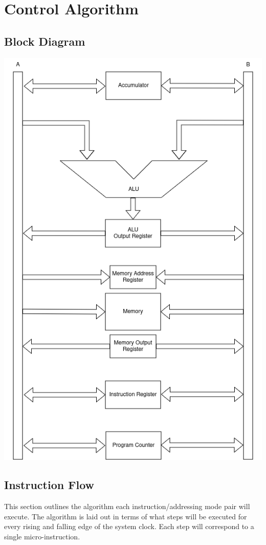 \section{Control Algorithm}\label{sec:abstract-description}
\subsection{Block Diagram}\label{subsec:block-diagram}
\begin{center}
    \includegraphics[scale=0.58]{img/Andromeda-Block Diagram.drawio}
\end{center}

\subsection{Instruction Flow}\label{subsec:state-machine-diagrams}
\par This section outlines the algorithm each instruction/addressing mode pair will execute.
The algorithm is laid out in terms of what steps will be executed for every rising and falling edge of the system clock.
Each step will correspond to a single micro-instruction.

